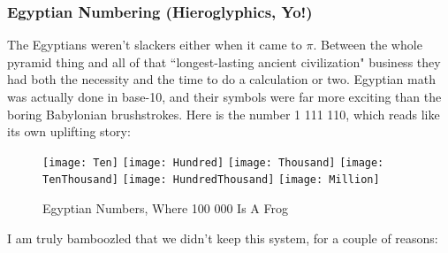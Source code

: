 \documentclass[11pt,titlepage]{article}
\begin{document}
\subsubsection*{Egyptian Numbering (Hieroglyphics, Yo!)}

The Egyptians weren't slackers either when it came to $\pi$. Between the whole pyramid thing and all of that ``longest-lasting ancient civilization" business they had both the necessity and the time to do a calculation or two. Egyptian math was actually done in base-10, and their symbols were far more exciting than the boring Babylonian brushstrokes. Here is the number 1 111 110, which reads like its own uplifting story:

\begin{figure}[h]
\centering
\texttt{[image: Ten]}\hspace{0.2cm}
\texttt{[image: Hundred]}\hspace{0.2cm}
\texttt{[image: Thousand]}\hspace{0.2cm}
\texttt{[image: TenThousand]}\hspace{0.2cm}
\texttt{[image: HundredThousand]}\hspace{0.2cm}
\texttt{[image: Million]}
\caption{Egyptian Numbers, Where 100 000 Is A Frog}
\end{figure}

I am truly bamboozled that we didn't keep this system, for a couple of reasons:
\end{document}

